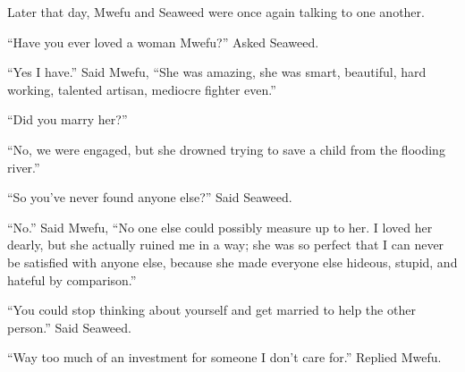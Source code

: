 \tbreak

Later that day, Mwe\-fu and Seaweed were once again talking to one another.

``Have you ever loved a woman Mwe\-fu?'' Asked Seaweed.

``Yes I have.'' Said Mwe\-fu, ``She was amazing, she was smart, beautiful, hard working, talented artisan, mediocre fighter even.''

``Did you marry her?''

``No, we were engaged, but she drowned trying to save a child from the flooding river.''

``So you've never found anyone else?'' Said Seaweed.

``No.'' Said Mwe\-fu, ``No one else could possibly measure up to her. I loved her dearly, but she actually ruined me in a way; she was so perfect that I can never be satisfied with anyone else, because she made everyone else hideous, stupid, and hateful by comparison.''

``You could stop thinking about yourself and get married to help the other person.'' Said Seaweed.

``Way too much of an investment for someone I don't care for.'' Replied Mwe\-fu.
